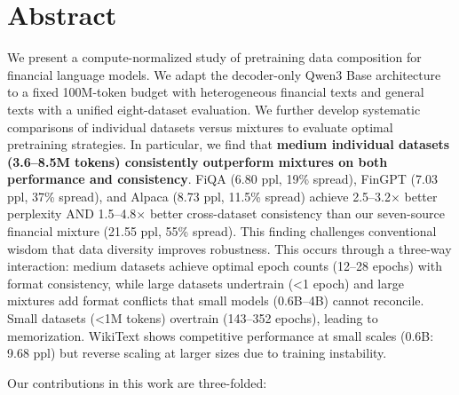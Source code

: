 \documentclass[11pt,a4paper,english,oneside]{book}
\begin{document}
\thispagestyle{empty}
\titleGP

\newpage

\setcounter{page}{1}

\section*{Abstract}
\thispagestyle{firststyle}

We present a compute-normalized study of pretraining data composition for financial language models. We adapt the decoder-only Qwen3 Base architecture to a fixed 100M-token budget with heterogeneous financial texts and general texts with a unified eight-dataset evaluation. We further develop systematic comparisons of individual datasets versus mixtures to evaluate optimal pretraining strategies. In particular, we find that \textbf{medium individual datasets (3.6–8.5M tokens) consistently outperform mixtures on both performance and consistency}. FiQA (6.80 ppl, 19\% spread), FinGPT (7.03 ppl, 37\% spread), and Alpaca (8.73 ppl, 11.5\% spread) achieve 2.5–3.2$\times$ better perplexity AND 1.5–4.8$\times$ better cross-dataset consistency than our seven-source financial mixture (21.55 ppl, 55\% spread). This finding challenges conventional wisdom that data diversity improves robustness. This occurs through a three-way interaction: medium datasets achieve optimal epoch counts (12–28 epochs) with format consistency, while large datasets undertrain (<1 epoch) and large mixtures add format conflicts that small models (0.6B–4B) cannot reconcile. Small datasets (<1M tokens) overtrain (143–352 epochs), leading to memorization. WikiText shows competitive performance at small scales (0.6B: 9.68 ppl) but reverse scaling at larger sizes due to training instability.

Our contributions in this work are three-folded:
\end{document}
